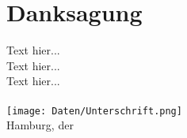 \section*{Danksagung}

Text hier...\\

Text hier...\\

Text hier...\\
\\
\hspace*{1cm}\texttt{[image: Daten/Unterschrift.png]}\\
\hspace*{1cm}Hamburg, der \Abgabe